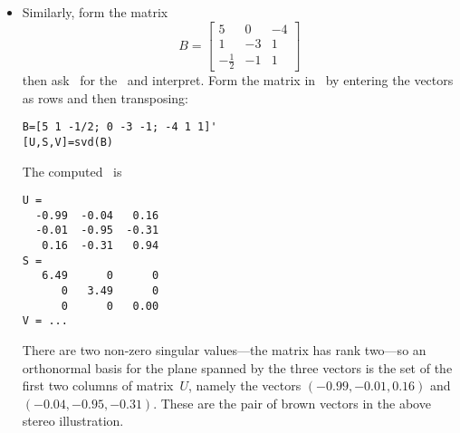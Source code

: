 \begin{example}
\begin{solution}
\begin{itemize}
\item Similarly, form the matrix 
\begin{equation*}
B=\begin{bmatrix} 5&0&-4\\1&-3&1\\-\frac12&-1&1 \end{bmatrix}
\end{equation*}
then ask \script\ for the \svd\ and interpret.
Form the matrix in \script\ by entering the vectors as rows and then transposing:
\begin{verbatim}
B=[5 1 -1/2; 0 -3 -1; -4 1 1]'
[U,S,V]=svd(B)
\end{verbatim}
\setbox\ajrqrbox\hbox{}%
\marginpar{\usebox{\ajrqrbox}}%
The computed \svd\ is \twodp
\begin{verbatim}
U =
  -0.99  -0.04   0.16
  -0.01  -0.95  -0.31
   0.16  -0.31   0.94
S =
   6.49      0      0
      0   3.49      0
      0      0   0.00
V = ...
\end{verbatim}
There are two non-zero singular values---the matrix has rank two---so an orthonormal basis for the plane spanned by the three vectors is the set of the first two columns of matrix~\(U\), namely the vectors  \((-0.99,-0.01,0.16)\) and \((-0.04,-0.95,-0.31)\).
These are the pair of brown vectors in the above stereo illustration.
\end{itemize} 
\end{solution}
\end{example}




